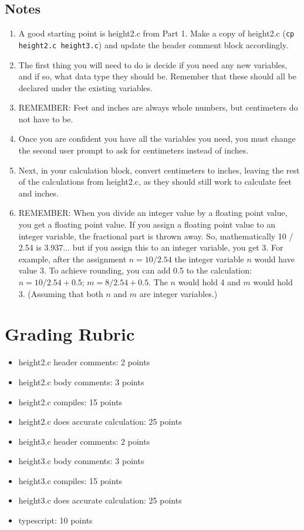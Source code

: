 \documentclass[letter,11pt]{article}
\begin{document}
\subsection*{Notes}
\begin{enumerate}
    \item A good starting point is height2.c from Part 1. Make a copy of height2.c (\texttt{cp height2.c height3.c}) and update the header comment block accordingly.
    \item The first thing you will need to do is decide if you need any new variables, and if so, what data type they should be. Remember that these should all be declared under the existing variables.
    \item REMEMBER: Feet and inches are always whole numbers, but centimeters do not have to be.
    \item Once you are confident you have all the variables you need, you must change the second user prompt to ask for centimeters instead of inches.
    \item Next, in your calculation block, convert centimeters to inches, leaving the rest of the calculations from height2.c, as they should still work to calculate feet and inches.
    \item REMEMBER: When you divide an integer value by a floating point value, you get a floating point value. If you assign a floating point value to an integer variable, the fractional part is thrown away. So, mathematically 10 / 2.54 is 3.937... but if you assign this to an integer variable, you get 3. For example, after the assignment $n = 10 / 2.54$ the integer variable $n$ would have value 3. To achieve rounding, you can add 0.5 to the calculation: $n = 10 / 2.54 + 0.5$; $m = 8 / 2.54 + 0.5$. The $n$ would hold 4 and $m$ would hold 3. (Assuming that both $n$ and $m$ are integer variables.)
\end{enumerate}

\section*{Grading Rubric}
\begin{itemize}
    \item height2.c header comments: 2 points
    \item height2.c body comments: 3 points
    \item height2.c compiles: 15 points
    \item height2.c does accurate calculation: 25 points
    \item height3.c header comments: 2 points
    \item height3.c body comments: 3 points
    \item height3.c compiles: 15 points
    \item height3.c does accurate calculation: 25 points
    \item typescript: 10 points
\end{itemize}
\end{document}
